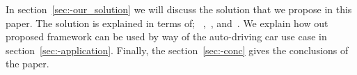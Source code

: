 In section~\ref{sec:-our_solution} we will discuss the solution that we propose in this paper. The solution is explained in terms of; ~,~, and~. We explain how out proposed framework can be used by way of the auto-driving car use case in section~\ref{sec:-application}. Finally, the section~\ref{sec:-conc} gives the conclusions of the paper.  


